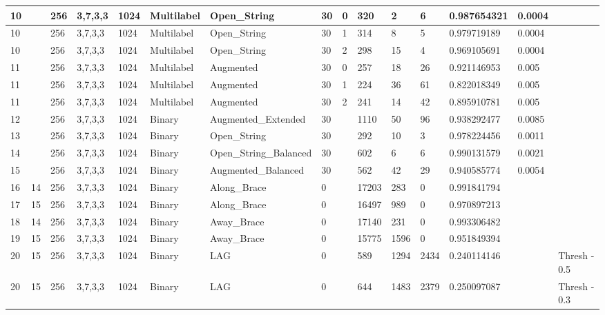 \documentclass[conference]{IEEEtran}
\begin{document}
\begin{table}[!ht]
\begin{adjustbox}{width=\textwidth}
\begin{tabular}{|l|l|l|l|l|l|l|l|l|l|l|l|l|l|l|}
        10 & ~ & 256 & 3,7,3,3 & 1024 & Multilabel & Open\_String & 30 & 0 & 320 & 2 & 6 & 0.987654321 & 0.0004 & ~ \\ \hline
        10 & ~ & 256 & 3,7,3,3 & 1024 & Multilabel & Open\_String & 30 & 1 & 314 & 8 & 5 & 0.979719189 & 0.0004 & ~ \\ \hline
        10 & ~ & 256 & 3,7,3,3 & 1024 & Multilabel & Open\_String & 30 & 2 & 298 & 15 & 4 & 0.969105691 & 0.0004 & ~ \\ \hline
        11 & ~ & 256 & 3,7,3,3 & 1024 & Multilabel & Augmented & 30 & 0 & 257 & 18 & 26 & 0.921146953 & 0.005 & ~ \\ \hline
        11 & ~ & 256 & 3,7,3,3 & 1024 & Multilabel & Augmented & 30 & 1 & 224 & 36 & 61 & 0.822018349 & 0.005 & ~ \\ \hline
        11 & ~ & 256 & 3,7,3,3 & 1024 & Multilabel & Augmented & 30 & 2 & 241 & 14 & 42 & 0.895910781 & 0.005 & ~ \\ \hline
        12 & ~ & 256 & 3,7,3,3 & 1024 & Binary & Augmented\_Extended & 30 & ~ & 1110 & 50 & 96 & 0.938292477 & 0.0085 & ~ \\ \hline
        13 & ~ & 256 & 3,7,3,3 & 1024 & Binary & Open\_String & 30 & ~ & 292 & 10 & 3 & 0.978224456 & 0.0011 & ~ \\ \hline
        14 & ~ & 256 & 3,7,3,3 & 1024 & Binary & Open\_String\_Balanced & 30 & ~ & 602 & 6 & 6 & 0.990131579 & 0.0021 & ~ \\ \hline
        15 & ~ & 256 & 3,7,3,3 & 1024 & Binary & Augmented\_Balanced & 30 & ~ & 562 & 42 & 29 & 0.940585774 & 0.0054 & ~ \\ \hline
        16 & 14 & 256 & 3,7,3,3 & 1024 & Binary & Along\_Brace & 0 & ~ & 17203 & 283 & 0 & 0.991841794 & ~ & ~ \\ \hline
        17 & 15 & 256 & 3,7,3,3 & 1024 & Binary & Along\_Brace & 0 & ~ & 16497 & 989 & 0 & 0.970897213 & ~ & ~ \\ \hline
        18 & 14 & 256 & 3,7,3,3 & 1024 & Binary & Away\_Brace & 0 & ~ & 17140 & 231 & 0 & 0.993306482 & ~ & ~ \\ \hline
        19 & 15 & 256 & 3,7,3,3 & 1024 & Binary & Away\_Brace & 0 & ~ & 15775 & 1596 & 0 & 0.951849394 & ~ & ~ \\ \hline
        20 & 15 & 256 & 3,7,3,3 & 1024 & Binary & LAG & 0 & ~ & 589 & 1294 & 2434 & 0.240114146 & ~ & Thresh - 0.5 \\ \hline
        20 & 15 & 256 & 3,7,3,3 & 1024 & Binary & LAG & 0 & ~ & 644 & 1483 & 2379 & 0.250097087 & ~ & Thresh - 0.3 \\ \hline

\end{tabular}
\end{adjustbox}
\end{table}
\end{document}
